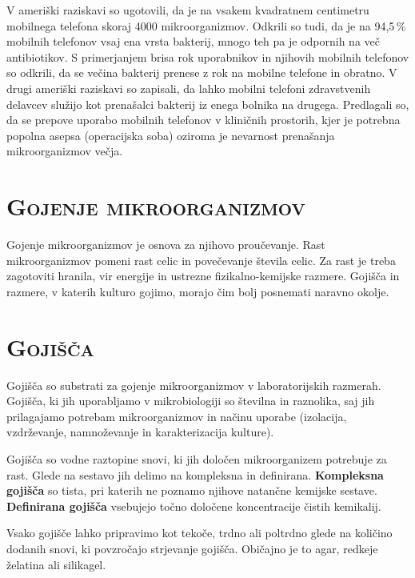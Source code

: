 \documentclass[12pt, a4paper]{report}
\begin{document}
V ameriški raziskavi so ugotovili, da je na vsakem kvadratnem centimetru mobilnega telefona skoraj 4000 mikroorganizmov. Odkrili so tudi, da je na 94,5\,\% mobilnih telefonov vsaj ena vrsta bakterij, mnogo teh pa je odpornih na več antibiotikov. S primerjanjem brisa rok uporabnikov in njihovih mobilnih telefonov so odkrili, da se večina bakterij prenese z rok na mobilne telefone in obratno. V drugi ameriški raziskavi so zapisali, da lahko mobilni telefoni zdravstvenih delavcev služijo kot prenašalci bakterij iz enega bolnika na drugega. Predlagali so, da se prepove uporabo mobilnih telefonov v kliničnih prostorih, kjer je potrebna popolna asepsa (operacijska soba) oziroma je nevarnost prenašanja mikroorganizmov večja.

\section{\textsc{Gojenje mikroorganizmov}}

Gojenje mikroorganizmov je osnova za njihovo proučevanje. Rast mikroorganizmov pomeni rast celic in povečevanje števila celic. Za rast je treba zagotoviti hranila, vir energije in ustrezne fizikalno-kemijske razmere. Gojišča in razmere, v katerih kulturo gojimo, morajo čim bolj posnemati naravno okolje.

\section{\textsc{Gojišča}}

Gojišča so substrati za gojenje mikroorganizmov v laboratorijskih razmerah. Gojišča, ki jih uporabljamo v mikrobiologiji so številna in raznolika, saj jih prilagajamo potrebam mikroorganizmov in načinu uporabe (izolacija, vzdrževanje, namnoževanje in karakterizacija kulture).

Gojišča so vodne raztopine snovi, ki jih določen mikroorganizem potrebuje za rast. Glede na sestavo jih delimo na kompleksna in definirana. \textbf{Kompleksna gojišča} so tista, pri katerih ne poznamo njihove natančne kemijske sestave. \textbf{Definirana gojišča} vsebujejo točno določene koncentracije čistih kemikalij.

Vsako gojišče lahko pripravimo kot tekoče, trdno ali poltrdno glede na količino dodanih snovi, ki povzročajo strjevanje gojišča. Običajno je to agar, redkeje želatina ali silikagel.
\end{document}
